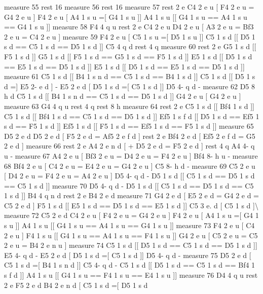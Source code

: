 measure 55 rest 16 measure 56 rest 16 measure 57 rest 2 e C4 2 e u \mbox{[} F4 2 e u = G4 2 e u \mbox{]} F4 2 e u \mbox{[} A4 1 s u =\mbox{[} G4 1 s u \mbox{]}\mbox{]} A4 1 s u \mbox{[}\mbox{[} G4 1 s u == A4 1 s u == G4 1 s u \mbox{]}\mbox{]} measure 58 F4 4 q u rest 2 e C4 2 e u D4 2 e u \mbox{[} A3 2 e u = Bf3 2 e u = C4 2 e u \mbox{]} measure 59 F4 2 e u \mbox{[} C5 1 s u =\mbox{[} D5 1 s u \mbox{]}\mbox{]} C5 1 s d \mbox{[}\mbox{[} D5 1 s d == C5 1 s d == D5 1 s d \mbox{]}\mbox{]} C5 4 q d rest 4 q measure 60 rest 2 e G5 1 s d \mbox{[}\mbox{[} F5 1 s d \mbox{]}\mbox{]} G5 1 s d \mbox{[}\mbox{[} F5 1 s d == G5 1 s d == F5 1 s d \mbox{]}\mbox{]} E5 1 s d \mbox{[}\mbox{[} D5 1 s d == E5 1 s d == D5 1 s d \mbox{]}\mbox{]} E5 1 s d \mbox{[}\mbox{[} D5 1 s d == E5 1 s d == D5 1 s d \mbox{]}\mbox{]} measure 61 C5 1 s d \mbox{[}\mbox{[} B4 1 s n d == C5 1 s d == B4 1 s d \mbox{]}\mbox{]} C5 1 s d \mbox{[}\mbox{[} D5 1 s d =\mbox{]} E5 2-\/ e d \mbox{]} -\/ E5 2 e d \mbox{[} D5 1 s d =\mbox{[} C5 1 s d \mbox{]}\mbox{]} D5 4-\/ q d -\/ measure 62 D5 8 h d C5 1 s d \mbox{[}\mbox{[} B4 1 s n d == C5 1 s d == D5 1 s d \mbox{]}\mbox{]} G4 2 e u \mbox{[} G4 2 e u \mbox{]} measure 63 G4 4 q u rest 4 q rest 8 h measure 64 rest 2 e C5 1 s d \mbox{[}\mbox{[} Bf4 1 s d \mbox{]}\mbox{]} C5 1 s d \mbox{[}\mbox{[} Bf4 1 s d == C5 1 s d == D5 1 s d \mbox{]}\mbox{]} Ef5 1 s f d \mbox{[}\mbox{[} D5 1 s d == Ef5 1 s d == F5 1 s d \mbox{]}\mbox{]} Ef5 1 s d \mbox{[}\mbox{[} F5 1 s d == Ef5 1 s d == F5 1 s d \mbox{]}\mbox{]} measure 65 D5 2 e d D5 2 e d \mbox{[} F5 2 e d = Af5 2 e f d \mbox{]} rest 2 e Bf4 2 e d \mbox{[} Ef5 2 e f d = G5 2 e d \mbox{]} measure 66 rest 2 e A4 2 e n d \mbox{[} + D5 2 e d = F5 2 e d \mbox{]} rest 4 q A4 4-\/ q u -\/ measure 67 A4 2 e u \mbox{[} Bf3 2 e u = D4 2 e u = F4 2 e u \mbox{]} Bf4 8-\/ h u -\/ measure 68 Bf4 2 e u \mbox{[} C4 2 e u = E4 2 e u = G4 2 e u \mbox{]} C5 8-\/ h d -\/ measure 69 C5 2 e u \mbox{[} D4 2 e u = F4 2 e u = A4 2 e u \mbox{]} D5 4-\/ q d -\/ D5 1 s d \mbox{[}\mbox{[} C5 1 s d == D5 1 s d == C5 1 s d \mbox{]}\mbox{]} measure 70 D5 4-\/ q d -\/ D5 1 s d \mbox{[}\mbox{[} C5 1 s d == D5 1 s d == C5 1 s d \mbox{]}\mbox{]} B4 4 q n d rest 2 e B4 2 e d measure 71 G4 2 e d \mbox{[} E5 2 e d = G4 2 e d = C5 2 e d \mbox{]} F5 1 s d \mbox{[}\mbox{[} E5 1 s d == D5 1 s d == E5 1 s d \mbox{]}\mbox{]} C5 3 e. d \mbox{[} C5 1 s d \mbox{]}\textbackslash{} measure 72 C5 2 e d C4 2 e u \mbox{[} F4 2 e u = G4 2 e u \mbox{]} F4 2 e u \mbox{[} A4 1 s u =\mbox{[} G4 1 s u \mbox{]}\mbox{]} A4 1 s u \mbox{[}\mbox{[} G4 1 s u == A4 1 s u == G4 1 s u \mbox{]}\mbox{]} measure 73 F4 2 e u \mbox{[} C4 2 e u \mbox{]} F4 1 s u \mbox{[}\mbox{[} G4 1 s u == A4 1 s u == F4 1 s u \mbox{]}\mbox{]} G4 2 e u \mbox{[} C5 2 e u = C5 2 e u = B4 2 e n u \mbox{]} measure 74 C5 1 s d \mbox{[}\mbox{[} D5 1 s d == C5 1 s d == D5 1 s d \mbox{]}\mbox{]} E5 4-\/ q d -\/ E5 2 e d \mbox{[} D5 1 s d =\mbox{[} C5 1 s d \mbox{]}\mbox{]} D5 4-\/ q d -\/ measure 75 D5 2 e d \mbox{[} C5 1 s d =\mbox{[} B4 1 s n d \mbox{]}\mbox{]} C5 4-\/ q d -\/ C5 1 s d \mbox{[}\mbox{[} D5 1 s d == C5 1 s d == Bf4 1 s f d \mbox{]}\mbox{]} A4 1 s u \mbox{[}\mbox{[} G4 1 s u == F4 1 s u == E4 1 s u \mbox{]}\mbox{]} measure 76 D4 4 q u rest 2 e F5 2 e d B4 2 e n d \mbox{[} C5 1 s d =\mbox{[} D5 1 s d 